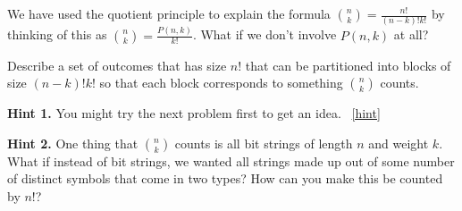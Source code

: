 \documentclass{book}
\begin{document}
\setcounter{project}{114}
\addtocounter{project}{-1}
\begin{activity}[]\label{activity-107}
\hypertarget{p-822}{}%
We have used the quotient principle to explain the formula \(\binom{n}{k} = \frac{n!}{(n-k)!k!}\) by thinking of this as \(\binom{n}{k} = \frac{P(n,k)}{k!}\).  What if we don't involve \(P(n,k)\) at all?%
\par
\hypertarget{p-823}{}%
Describe a set of outcomes that has size \(n!\) that can be partitioned into blocks of size \((n-k)!k!\) so that each block corresponds to something \(\binom{n}{k}\) counts.%
\par\smallskip%
\noindent\textbf{Hint 1.}\hypertarget{hint-70}{}\quad%
\hypertarget{p-824}{}%
You might try the next problem first to get an idea.%
~\hfill{\tiny\hyperlink{a-114}{[hint]}\hypertarget{q-114}{}}\par\smallskip%
\noindent\textbf{Hint 2.}\hypertarget{hint-71}{}\quad%
\hypertarget{p-825}{}%
One thing that \(\binom{n}{k}\) counts is all bit strings of length \(n\) and weight \(k\).  What if instead of bit strings, we wanted all strings made up out of some number of distinct symbols that come in two types?  How can you make this be counted by \(n!\)?%
\end{activity}
\end{document}
